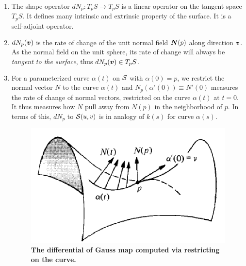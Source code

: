 \documentclass[11pt]{article}
\begin{document}
\begin{enumerate}
\item The shape operator $dN_{p}: T_{p}S \rightarrow T_{p}S$ is a linear operator on the tangent space $T_{p}S$. It defines many intrinsic and extrinsic property of the surface. It is a self-adjoint operator. 

\item $dN_{p}(\boldsymbol{v})$ is the rate of change of the unit normal field $\boldsymbol{N}(p)$ along direction $\boldsymbol{v}$. As the normal field on the unit sphere, its rate of change will always be \emph{tangent to the surface}, thus $dN_{p}(\boldsymbol{v}) \in T_{p}S$.  


\item For a parameterized curve $\alpha(t)$ on ${\mathcal S}$ with $\alpha(0) = p$, we restrict the normal vector $N$ to the curve $\alpha(t)$ and $N_{p}(\alpha'(0)) \equiv N'(0)$ measures the rate of change of normal vectors, restricted on the curve $\alpha(t)$ at $t=0$. It thus measures how $N$ pull away from $N(p)$ in the neighborhood of $p$.  In terms of this, $dN_{p} $ to ${\mathcal S}(u,v)$  is in analogy of $k(s)$ for curve $\alpha(s)$.\\

\begin{figure}[thb]
\centering
\begin{minipage}{0.5\linewidth}
 \centerline{\includegraphics[scale = 0.55]{diff_gauss.png}}
\end{minipage}
\caption{\scriptsize
\textbf{The differential of Gauss map computed via restricting on the curve.}}
\end{figure}


\end{enumerate}
\end{document}
